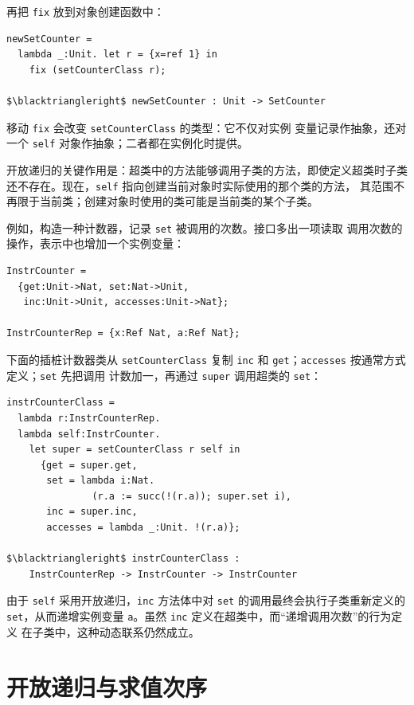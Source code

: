 再把 \texttt{fix} 放到对象创建函数中：

\begin{lstlisting}[mathescape=true]
newSetCounter =
  lambda _:Unit. let r = {x=ref 1} in
    fix (setCounterClass r);

$\blacktriangleright$ newSetCounter : Unit -> SetCounter
\end{lstlisting}

移动 \texttt{fix} 会改变 \texttt{setCounterClass} 的类型：它不仅对实例
变量记录作抽象，还对一个 \texttt{self} 对象作抽象；二者都在实例化时提供。

开放递归的关键作用是：超类中的方法能够调用子类的方法，即使定义超类时子类
还不存在。现在，\texttt{self} 指向创建当前对象时实际使用的那个类的方法，
其范围不再限于当前类；创建对象时使用的类可能是当前类的某个子类。

例如，构造一种计数器，记录 \texttt{set} 被调用的次数。接口多出一项读取
调用次数的操作，表示中也增加一个实例变量：

\begin{lstlisting}[mathescape=true]
InstrCounter =
  {get:Unit->Nat, set:Nat->Unit,
   inc:Unit->Unit, accesses:Unit->Nat};

InstrCounterRep = {x:Ref Nat, a:Ref Nat};
\end{lstlisting}

下面的插桩计数器类从 \texttt{setCounterClass} 复制 \texttt{inc} 和
\texttt{get}；\texttt{accesses} 按通常方式定义；\texttt{set} 先把调用
计数加一，再通过 \texttt{super} 调用超类的 \texttt{set}：

\begin{lstlisting}[mathescape=true]
instrCounterClass =
  lambda r:InstrCounterRep.
  lambda self:InstrCounter.
    let super = setCounterClass r self in
      {get = super.get,
       set = lambda i:Nat.
               (r.a := succ(!(r.a)); super.set i),
       inc = super.inc,
       accesses = lambda _:Unit. !(r.a)};

$\blacktriangleright$ instrCounterClass :
    InstrCounterRep -> InstrCounter -> InstrCounter
\end{lstlisting}

由于 \texttt{self} 采用开放递归，\texttt{inc} 方法体中对 \texttt{set}
的调用最终会执行子类重新定义的 \texttt{set}，从而递增实例变量
\texttt{a}。虽然 \texttt{inc} 定义在超类中，而“递增调用次数”的行为定义
在子类中，这种动态联系仍然成立。

\section{开放递归与求值次序}
\label{sec:18.11}


